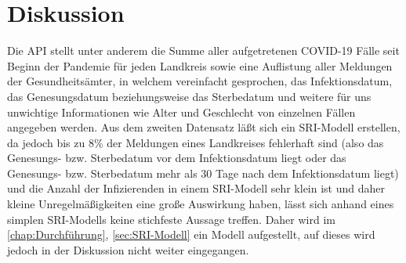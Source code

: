 \chapter{Diskussion}\label{chap:Diskussion}







Die API stellt unter anderem die Summe aller aufgetretenen COVID-19 Fälle seit Beginn der Pandemie für jeden Landkreis sowie eine Auflistung aller Meldungen der Gesundheitsämter, in welchem vereinfacht gesprochen, das Infektionsdatum, das Genesungsdatum beziehungsweise das Sterbedatum und weitere für uns unwichtige Informationen wie Alter und Geschlecht von einzelnen Fällen angegeben werden. Aus dem zweiten Datensatz läßt sich ein SRI-Modell erstellen, da jedoch bis zu 8\% der Meldungen eines Landkreises fehlerhaft sind (also das Genesungs- bzw. Sterbedatum vor dem Infektionsdatum liegt oder das Genesungs- bzw. Sterbedatum mehr als 30 Tage nach dem Infektionsdatum liegt) und die Anzahl der Infizierenden in einem SRI-Modell sehr klein ist und daher kleine Unregelmäßigkeiten eine große Auswirkung haben, lässt sich anhand eines simplen SRI-Modells keine stichfeste Aussage treffen. Daher wird im \autoref{chap:Durchführung}, \autoref{sec:SRI-Modell} ein Modell aufgestellt, auf dieses wird jedoch in der Diskussion nicht weiter eingegangen.
